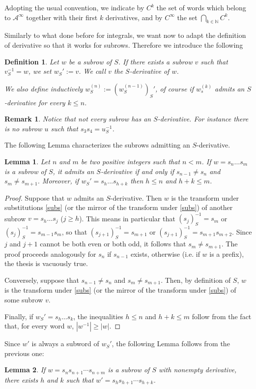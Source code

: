 \documentclass[10pt,a4paper]{article}
\newtheorem{lemma}{Lemma}
\newtheorem{rem}{Remark}
\newtheorem{defi}{Definition}
\begin{document}
Adopting the usual convention, we indicate by $C^k$ the set of words which belong to $\mathcal{A}^{\infty}$ together with their first $k$ derivatives, and by $C^{\infty}$ the set $\bigcap_{k\in\mathbb{N}} C^k$. 

Similarly to what done before for integrals, we want now to adapt the definition of derivative so that it works for subrows. Therefore we introduce the following

\begin{defi}
Let $w$ be a subrow of $S$. If there exists a subrow $v$ such that $v_S^{-1}=w$, we set $w_S':=v$. We call $v$ the $S$-derivative of $w$. 

We also define inductively $w_S^{(n)}:=(w_S^{(n-1)})_S'$, of course if $w_s^{(k)}$ admits an $S$-derivative for every $k\le n$.
\end{defi}


\begin{rem}
Notice that not every subrow has an $S$-derivative. For instance there is no subrow $u$ such that $s_{3}s_4=u_S^{-1}$. 
\label{Sderiv}
\end{rem}
The following Lemma characterizes the subrows admitting an $S$-derivative.

\begin{lemma}
Let $n$ and $m$ be two positive integers such that $n<m$. If $w=s_n\dots s_{m}$ is a subrow of $S$, it admits an $S$-derivative if and only if  $s_{n-1}\ne s_n$ and $s_{m}\ne s_{m+1}$. Moreover, if $w_S'=s_h\dots s_{h+k}$ then $h\le n$ and $h+k\le m$.
\label{findderivativeS}
\end{lemma}
\begin{proof}
Suppose that $w$ admits an $S$-derivative. Then $w$ is the transform under substitutions \eqref{subs} (or the mirror of the transform under \eqref{subs}) of another subrow $v=s_h \dots s_j$ ($j\ge h$). This means in particular that $(s_j)_S^{-1}=s_m$ or $(s_j)_S^{-1}=s_{m-1}s_{m}$, so that $(s_{j+1})_S^{-1}=s_{m+1}$ or $(s_{j+1})_S^{-1}=s_{m+1}s_{m+2}$. Since $j$ and $j+1$ cannot be both even or both odd, it follows that $s_m \ne s_{m+1}$. The proof proceeds analogously for $s_n$ if $s_{n-1}$ exists, otherwise (i.e. if $w$ is a prefix), the thesis is vacuously true.

Conversely, suppose that $s_{n-1}\ne s_n$ and $s_{m}\ne s_{m+1}$. Then, by definition of $S$, $w$ is the transform under \eqref{subs} (or the mirror of the transform under \eqref{subs}) of some subrow $v$.

Finally, if $w_S'=s_h\dots s_k$, the inequalities  $h\le n$ and $h+k\le m$ follow from the fact that, for every word $w$, $|w^{-1}|\ge |w|$. 
\end{proof}
 Since $w'$ is always a subword of $w_S'$, the following Lemma follows from the previous one:
\begin{lemma}
If $w=s_ns_{n+1}\cdots s_{n+m}$ is a subrow of $S$ with nonempty derivative, there exists $h$ and $k$ such that $w'=s_{h}s_{h+1}\cdots s_{h+k}$.
\label{find_derivative}
\end{lemma}
\end{document}
